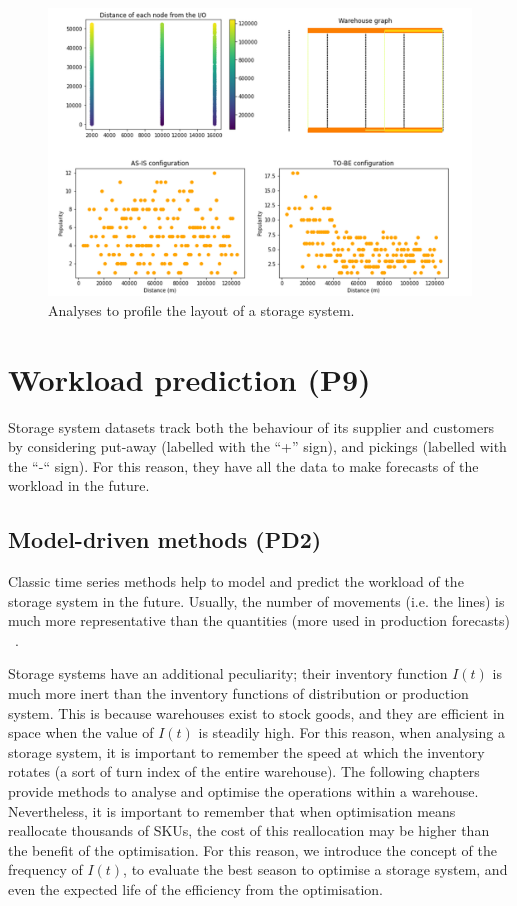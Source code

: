 \begin{figure}[hbt!]
\centering
\includegraphics[width=1.0\textwidth]{SectionWarehouses/control_figures/fig_layout_profile.png}
\captionsetup{type=figure}
\caption{Analyses to profile the layout of a storage system.}
\label{fig_layout_profile}
\end{figure}

\clearpage

\section{Workload prediction (P9)}
Storage system datasets track both the behaviour of its supplier and customers by considering put-away (labelled with the “+” sign), and pickings (labelled with the “-“ sign). For this reason, they have all the data to make forecasts of the workload in the future.

\subsection{Model-driven methods (PD2)}
Classic time series methods help to model and predict the workload of the storage system in the future. Usually, the number of movements (i.e. the lines) is much more representative than the quantities (more used in production forecasts) ~\cite{VanGils2017a}.\par

Storage systems have an additional peculiarity; their inventory function $I(t)$ is much more inert than the inventory functions of distribution or production system. This is because warehouses exist to stock goods, and they are efficient in space when the value of $I(t)$ is steadily high. For this reason, when analysing a storage system, it is important to remember the speed at which the inventory rotates (a sort of turn index of the entire warehouse). The following chapters provide methods to analyse and optimise the operations within a warehouse. Nevertheless, it is important to remember that when optimisation means reallocate thousands of SKUs, the cost of this reallocation may be higher than the benefit of the optimisation. For this reason, we introduce the concept of the frequency of $I(t)$, to evaluate the best season to optimise a storage system, and even the expected life of the efficiency from the optimisation.

